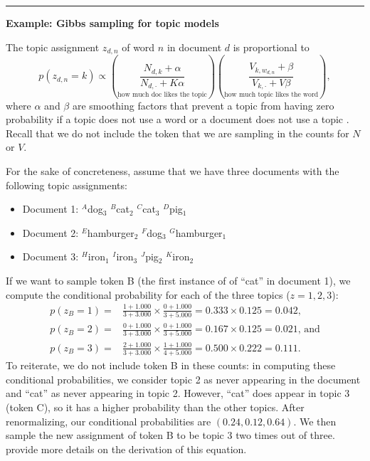 \documentclass[]{krantz}
\begin{document}
\begin{center}\rule{0.5\linewidth}{\linethickness}\end{center}

\textbf{Example: Gibbs sampling for topic models}

The topic assignment \(z_{d,n}\) of word \(n\) in document \(d\) is
proportional to
\[p(z_{d,n}=k) \propto \left( \underset{\text{how much doc likes the topic}}{\frac{N_{d,k} + \alpha}{N_{d, \cdot} + K \alpha}} \right) \left(\underset{\text{how much topic likes the word}}{\frac{V_{k,w_{d,n}} + \beta}{V_{k, \cdot} + V \beta}} \right),\]
where \(\alpha\) and \(\beta\) are smoothing factors that prevent a
topic from having zero probability if a topic does not use a word or a
document does not use a topic \citep{wallach-09b}. Recall that we do not
include the token that we are sampling in the counts for \(N\) or \(V\).

For the sake of concreteness, assume that we have three documents with
the following topic assignments:

\begin{itemize}
\item
  Document 1: \(^A\)dog\(_3\) \(^B\)cat\(_2\) \(^C\)cat\(_3\)
  \(^D\)pig\(_1\)
\item
  Document 2: \(^E\)hamburger\(_2\) \(^F\)dog\(_3\)
  \(^G\)hamburger\(_1\)
\item
  Document 3: \(^H\)iron\(_1\) \(^I\)iron\(_3\) \(^J\)pig\(_2\)
  \(^K\)iron\(_2\)
\end{itemize}

If we want to sample token B (the first instance of of ``cat'' in
document 1), we compute the conditional probability for each of the
three topics (\(z=1,2,3\)): \[\begin{aligned}
p(z_B = 1) = & \frac{1 + 1.000}{3 + 3.000} \times \frac{0
    + 1.000}{3 + 5.000} = 0.333 \times 0.125 = 0.042, \\[4pt]
p(z_B = 2) = & \frac{0 + 1.000}{3 + 3.000} \times \frac{0
    + 1.000}{3 + 5.000} = 0.167 \times 0.125 = 0.021\mbox{, and} \\[4pt]
p(z_B = 3) = & \frac{2 + 1.000}{3 + 3.000} \times \frac{1 + 1.000}{4 + 5.000} = 0.500 \times 0.222 = 0.111.\end{aligned}\]
To reiterate, we do not include token B in these counts: in computing
these conditional probabilities, we consider topic 2 as never appearing
in the document and ``cat'' as never appearing in topic 2. However,
``cat'' does appear in topic 3 (token C), so it has a higher probability
than the other topics. After renormalizing, our conditional
probabilities are \((0.24, 0.12, 0.64)\). We then sample the new
assignment of token B to be topic 3 two times out of three.
\citet{griffiths-04} provide more details on the derivation of this
equation.
\end{document}
